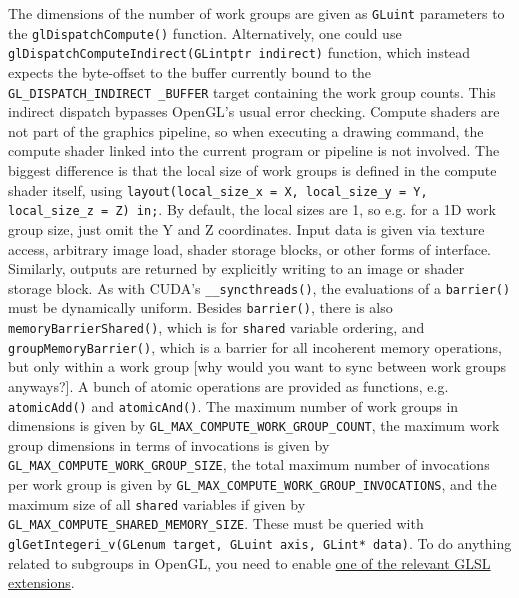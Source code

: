 \documentclass[8pt, table, xcdraw]{article}%
\begin{document}
The dimensions of the number of work groups are given as \lstinline{GLuint} parameters to the \lstinline{glDispatchCompute()} function. Alternatively, one could use \lstinline{glDispatchComputeIndirect(GLintptr indirect)} function, which instead expects the byte-offset to the buffer currently bound to the \lstinline{GL_DISPATCH_INDIRECT _BUFFER} target containing the work group counts. This indirect dispatch bypasses OpenGL's usual error checking. Compute shaders are not part of the graphics pipeline, so when executing a drawing command, the compute shader linked into the current program or pipeline is not involved. The biggest difference is that the local size of work groups is defined in the compute shader itself, using \lstinline{layout(local_size_x = X, local_size_y = Y, local_size_z = Z) in;}. By default, the local sizes are 1, so e.g. for a 1D work group size, just omit the Y and Z coordinates. Input data is given via texture access, arbitrary image load, shader storage blocks, or other forms of interface. Similarly, outputs are returned by explicitly writing to an image or shader storage block. As with CUDA's \lstinline{__syncthreads()}, the evaluations of a \lstinline{barrier()} must be dynamically uniform. Besides \lstinline{barrier()}, there is also \lstinline{memoryBarrierShared()}, which is for \lstinline{shared} variable ordering, and \lstinline{groupMemoryBarrier()}, which is a barrier for all incoherent memory operations, but only within a work group [why would you want to sync between work groups anyways?]. A bunch of atomic operations are provided as functions, e.g. \lstinline{atomicAdd()} and \lstinline{atomicAnd()}. The maximum number of work groups in dimensions is given by \lstinline{GL_MAX_COMPUTE_WORK_GROUP_COUNT}, the maximum work group dimensions in terms of invocations is given by \lstinline{GL_MAX_COMPUTE_WORK_GROUP_SIZE}, the total maximum number of invocations per work group is given by \lstinline{GL_MAX_COMPUTE_WORK_GROUP_INVOCATIONS}, and the maximum size of all \lstinline{shared} variables if given by \lstinline{GL_MAX_COMPUTE_SHARED_MEMORY_SIZE}. These must be queried with \lstinline{glGetIntegeri_v(GLenum target, GLuint axis, GLint* data)}. To do anything related to subgroups in OpenGL, you need to enable \href{https://github.com/KhronosGroup/GLSL/blob/5757aa6a24a1e92faeae29b0cc1d502c74ca2a78/extensions/khr/GL_KHR_shader_subgroup.txt#L87}{one of the relevant GLSL extensions}.
\end{document}
